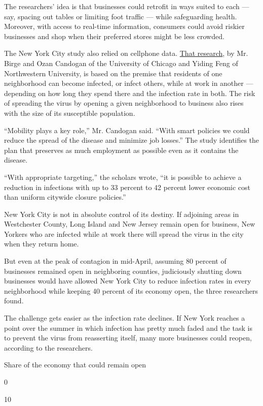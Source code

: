 The researchers' idea is that businesses could retrofit in ways suited
to each --- say, spacing out tables or limiting foot traffic --- while
safeguarding health. Moreover, with access to real-time information,
consumers could avoid riskier businesses and shop when their preferred
stores might be less crowded.

The New York City study also relied on cellphone data.
\href{https://papers.ssrn.com/sol3/papers.cfm?abstract_id=3590621}{That
research}, by Mr. Birge and Ozan Candogan of the University of Chicago
and Yiding Feng of Northwestern University, is based on the premise that
residents of one neighborhood can become infected, or infect others,
while at work in another --- depending on how long they spend there and
the infection rate in both. The risk of spreading the virus by opening a
given neighborhood to business also rises with the size of its
susceptible population.

``Mobility plays a key role,'' Mr. Candogan said. ``With smart policies
we could reduce the spread of the disease and minimize job losses.'' The
study identifies the plan that preserves as much employment as possible
even as it contains the disease.

``With appropriate targeting,'' the scholars wrote, ``it is possible to
achieve a reduction in infections with up to 33 percent to 42 percent
lower economic cost than uniform citywide closure policies.''

New York City is not in absolute control of its destiny. If adjoining
areas in Westchester County, Long Island and New Jersey remain open for
business, New Yorkers who are infected while at work there will spread
the virus in the city when they return home.

But even at the peak of contagion in mid-April, assuming 80 percent of
businesses remained open in neighboring counties, judiciously shutting
down businesses would have allowed New York City to reduce infection
rates in every neighborhood while keeping 40 percent of its economy
open, the three researchers found.

The challenge gets easier as the infection rate declines. If New York
reaches a point over the summer in which infection has pretty much faded
and the task is to prevent the virus from reasserting itself, many more
businesses could reopen, according to the researchers.

Share of the economy that could remain open

0

10

